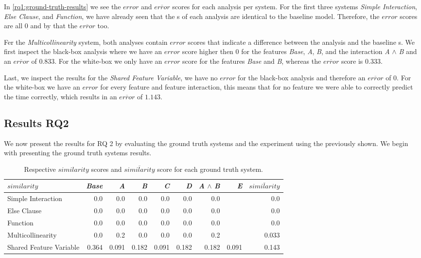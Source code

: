 In \autoref{rq1:ground-truth-results} we see the $error$ and $\overline{error}$ scores for each analysis per system. 
For the first three systems \emph{Simple Interaction}, \emph{Else Clause}, and \emph{Function},
we have already seen that the {\perfInfluenceModel}s of each analysis are identical to the baseline model. 
Therefore, the $error$ scores are all $0$ and by that the $\overline{error}$ too.

Fer the \emph{Multicollinearity} system, both analyses contain $error$ scores that indicate a difference 
between the analysis and the baseline {\perfInfluenceModel}s. We first inspect the black-box analysis {\perfInfluenceModel} 
where we have an $error$ score higher then $0$ for the features \emph{Base}, \emph{A}, \emph{B}, 
and the interaction \emph{A} $\land$ \emph{B} and an $\overline{error}$ of $0.833$. 
For the white-box we only have an $error$ score for the features \emph{Base} and \emph{B}, whereas the $\overline{error}$ score is $0.333$.

Last, we inspect the results for the \emph{Shared Feature Variable}, we have no $error$ for the black-box analysis and therefore an $\overline{error}$
of $0$. For the white-box we have an $error$ for every feature and feature interaction, this means that for no feature we were able to
correctly predict the time correctly, which results in an $\overline{error}$ of $1.143$.

\subsection{Results RQ2}

We now present the results for RQ 2 by evaluating the ground truth systems and the experiment using the {\perfInfluenceModel} 
previously shown. We begin with presenting the ground truth systems results.

\begin{table}[H]
    \centering
    \begin{tabular}{lrrrrrrrr}    \toprule
    $similarity$ & \emph{Base} & \emph{A} & \emph{B} & \emph{C} & \emph{D} & \emph{A} $\land$ \emph{B} & \emph{E} & $\overline{similarity}$ \\ \midrule
    Simple Interaction & 0.0 & 0.0 & 0.0 & 0.0 & 0.0 & 0.0 &  & 0.0  \\
    Else Clause & 0.0 & 0.0 & 0.0 & 0.0 & 0.0 & 0.0 & & 0.0 \\
    Function & 0.0 & 0.0 & 0.0 & 0.0 & 0.0 & 0.0 &  & 0.0\\
    Multicollinearity & 0.0 & 0.2 & 0.0 & 0.0 & 0.0 & 0.2 &  & 0.033   \\
    Shared Feature Variable & 0.364 & 0.091 & 0.182 & 0.091 &0.182 & 0.182 & 0.091 & 0.143 \\ \bottomrule
    \end{tabular}
    \caption{Respective $similarity$ scores and $\overline{similarity}$ score for each ground truth system.}
    \label{rq2:ground-truth}
\end{table}

